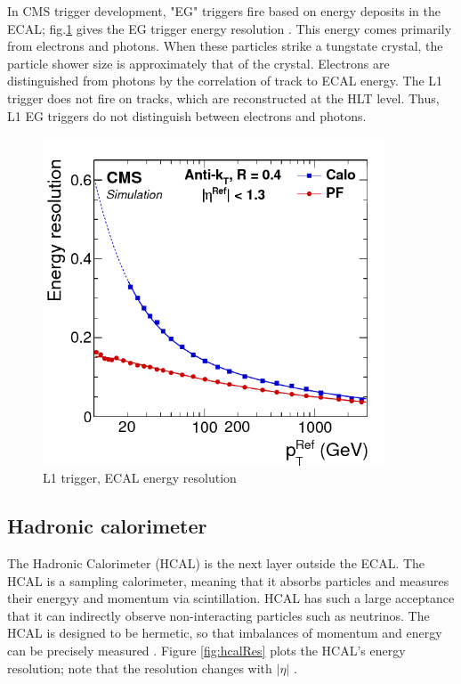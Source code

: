 In CMS trigger development, "EG" triggers fire based on energy deposits in the ECAL; fig.\ref{fig:ecalResL1} gives the EG trigger energy resolution \cite{Bayatian:2006nff}. This energy comes primarily from electrons and photons. When these particles strike a tungstate crystal, the particle shower size is approximately that of the crystal. Electrons are distinguished from photons by the correlation of track to ECAL energy. The L1 trigger does not fire on tracks, which are reconstructed at the HLT level. Thus, L1 EG triggers do not distinguish between electrons and photons. 

\begin{figure}[]
\begin{centering}
\includegraphics[width=4in]{Chapter3/importfigs/Figure_013-a.png}
\par\end{centering}
\caption{L1 trigger, ECAL energy resolution \cite{Bayatian:2006nff}\label{fig:ecalResL1}}
\end{figure}
 
 
\subsection{Hadronic calorimeter}

The Hadronic Calorimeter (HCAL) is the next layer outside the ECAL. The HCAL is a sampling calorimeter, meaning that it absorbs particles and measures their energyy and momentum via scintillation. HCAL has such a large acceptance that it can indirectly observe non-interacting particles such as neutrinos. The HCAL is designed to be hermetic, so that imbalances of momentum and energy can be precisely measured \cite{Baiatian:2007xva}. Figure \ref{fig:hcalRes} plots the HCAL's energy resolution; note that the resolution changes with $|\eta|$ \cite{Bayatian:2006nff}.

